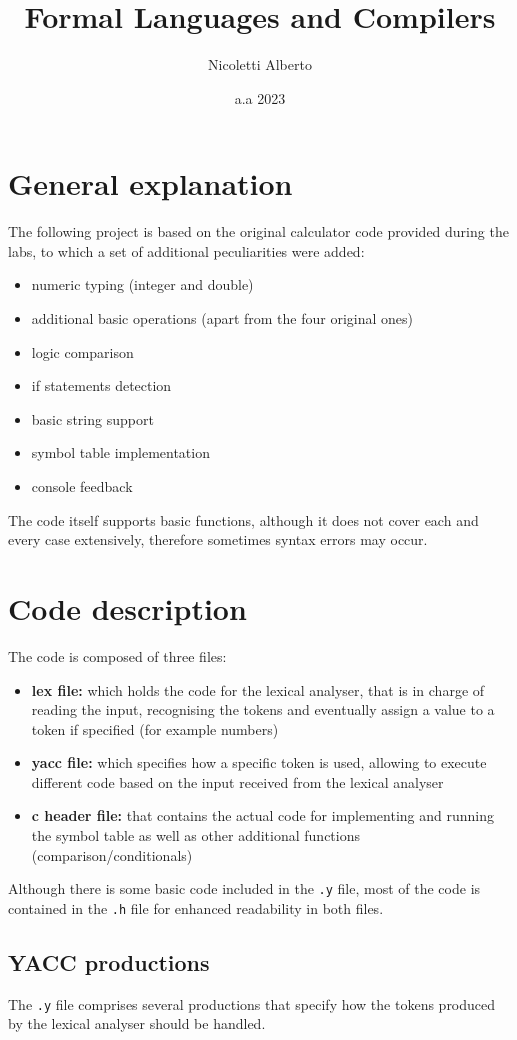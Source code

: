 \documentclass{article}
\title{Formal Languages and Compilers}
\author{Nicoletti Alberto }
\date{a.a 2023}
\begin{document}
\maketitle
\section*{General explanation}
The following project is based on the original calculator code provided during the labs, to which a set of additional peculiarities were added:
\begin{itemize}
    \item numeric typing (integer and double)
    \item additional basic operations (apart from the four original ones)
    \item logic comparison
    \item if statements detection
    \item basic string support
    \item symbol table implementation
    \item console feedback
\end{itemize}
The code itself supports basic functions, although it does not cover each and every case extensively, therefore sometimes syntax errors may occur. 
\section*{Code description}
The code is composed of three files:
\begin{itemize}
    \item \textbf{lex file:} which holds the code for the lexical analyser, that is in charge of reading the input, recognising the tokens and eventually assign a value to a token if specified (for example numbers)
    \item \textbf{yacc file:} which specifies how a specific token is used, allowing to execute different code based on the input received from the lexical analyser
    \item \textbf{c header file:} that contains the actual code for implementing and running the symbol table as well as other additional functions (comparison/conditionals)
\end{itemize}
Although there is some basic code included in the \verb|.y| file, most of the code is contained in the \verb|.h| file for enhanced readability in both files.
\subsection*{YACC productions}
The \verb|.y| file comprises several productions that specify how the tokens produced by the lexical analyser should be handled.\\
\end{document}
